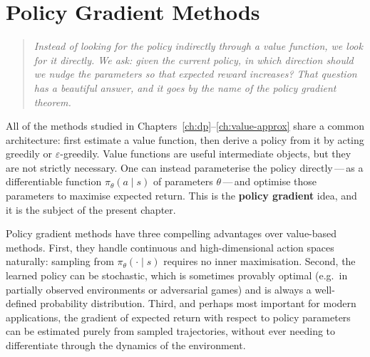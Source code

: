 \chapter{Policy Gradient Methods}
\label{ch:pg}

\begin{quote}
\itshape
Instead of looking for the policy indirectly through a value function, we look for it directly. We ask: given the current policy, in which direction should we nudge the parameters so that expected reward increases? That question has a beautiful answer, and it goes by the name of the policy gradient theorem.
\end{quote}

\bigskip

All of the methods studied in Chapters~\ref{ch:dp}--\ref{ch:value-approx} share a common architecture: first estimate a value function, then derive a policy from it by acting greedily or $\varepsilon$-greedily.  Value functions are useful intermediate objects, but they are not strictly necessary.  One can instead parameterise the policy directly\,---\,as a differentiable function $\pi_\theta(a \mid s)$ of parameters $\theta$\,---\,and optimise those parameters to maximise expected return.  This is the \textbf{policy gradient} idea, and it is the subject of the present chapter.

Policy gradient methods have three compelling advantages over value-based methods.  First, they handle continuous and high-dimensional action spaces naturally: sampling from $\pi_\theta(\cdot \mid s)$ requires no inner maximisation.  Second, the learned policy can be stochastic, which is sometimes provably optimal (e.g.\ in partially observed environments or adversarial games) and is always a well-defined probability distribution.  Third, and perhaps most important for modern applications, the gradient of expected return with respect to policy parameters can be estimated purely from sampled trajectories, without ever needing to differentiate through the dynamics of the environment.


